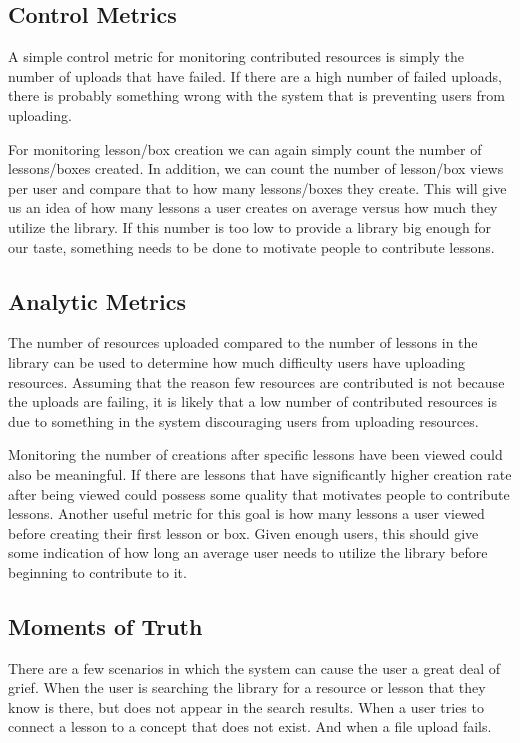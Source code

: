 \documentclass[10pt,letter]{article}
\begin{document}
\subsection{Control Metrics}
A simple control metric for monitoring contributed resources is simply the
number of uploads that have failed. If there are a high number of failed
uploads, there is probably something wrong with the system that is preventing
users from uploading.

For monitoring lesson/box creation we can again simply count the number of
lessons/boxes created. In addition, we can count the number of lesson/box views
per user and compare that to how many lessons/boxes they create. This will give
us an idea of how many lessons a user creates on average versus how much they
utilize the library. If this number is too low to provide a library big enough
for our taste, something needs to be done to motivate people to contribute
lessons.

\subsection{Analytic Metrics}
The number of resources uploaded compared to the number of lessons in the
library can be used to determine how much difficulty users have uploading
resources. Assuming that the reason few resources are contributed is not because
the uploads are failing, it is likely that a low number of contributed resources
is due to something in the system discouraging users from uploading resources.

Monitoring the number of creations after specific lessons have been viewed could
also be meaningful. If there are lessons that have significantly higher creation
rate after being viewed could possess some quality that motivates people to
contribute lessons. Another useful metric for this goal is how many lessons a
user viewed before creating their first lesson or box. Given enough users, this
should give some indication of how long an average user needs to utilize the
library before beginning to contribute to it.

\subsection{Moments of Truth}
There are a few scenarios in which the system can cause the user a great deal of
grief. When the user is searching the library for a resource or lesson that they
know is there, but does not appear in the search results. When a user tries to
connect a lesson to a concept that does not exist. And when a file upload fails.
\end{document}

